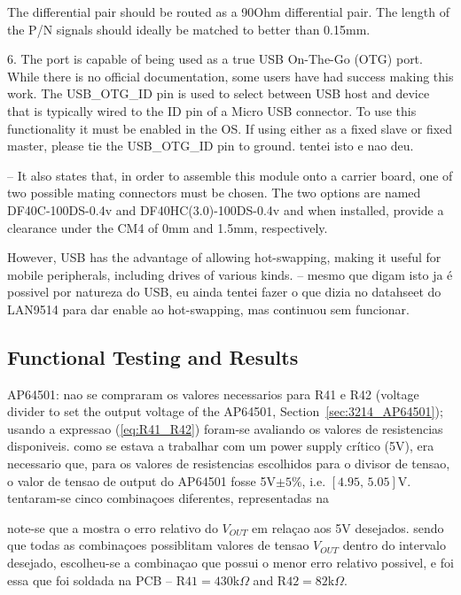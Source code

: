     The differential pair should be routed as a 90Ohm differential pair. The length of the P/N signals should ideally be matched to better than 0.15mm.

    6. The port is capable of being used as a true USB On-The-Go (OTG) port. While there is no official documentation, some users have had success making this work. The USB\_OTG\_ID pin is used to select between USB host and device that is typically wired to the ID pin of a Micro USB connector. To use this functionality it must be enabled in the OS. If using either as a fixed slave or fixed master, please tie the USB\_OTG\_ID pin to ground. tentei isto e nao deu.

	-- It also states that, in order to assemble this module onto a carrier board, one of two possible mating connectors must be chosen. The two options are named DF40C-100DS-0.4v and DF40HC(3.0)-100DS-0.4v and when installed, provide a clearance under the CM4 of 0mm and 1.5mm, respectively. 

    However, USB has the advantage of allowing hot-swapping, making it useful for mobile peripherals, including drives of various kinds. -- mesmo que digam isto ja é possivel por natureza do USB, eu ainda tentei fazer o que dizia no datahseet do LAN9514 para dar enable ao hot-swapping, mas continuou sem funcionar.
	

\subsection{Functional Testing and Results}\label{sec:55_FunctionalTesting}

AP64501:
nao se compraram os valores necessarios para R41 e R42 (voltage divider to set the output voltage of the AP64501, Section~\ref{sec:3214_AP64501}); usando a expressao (\ref{eq:R41_R42}) foram-se avaliando os valores de resistencias disponiveis. como se estava a trabalhar com um power supply crítico (5V), era necessario que, para os valores de resistencias escolhidos para o divisor de tensao, o valor de tensao de output do AP64501 fosse 5V$\pm 5\%$, i.e. $[4.95,\, 5.05]$V. tentaram-se cinco combinaçoes diferentes, representadas na 



note-se que a
mostra o erro relativo do $V_{OUT}$ em relaçao aos 5V desejados. sendo que todas as combinaçoes possiblitam valores de tensao $V_{OUT}$ dentro do intervalo desejado, escolheu-se a combinaçao que possui o menor erro relativo possivel, e foi essa que foi soldada na PCB -- R$41=430$k$\Omega$ and R$42=82$k$\Omega$.

